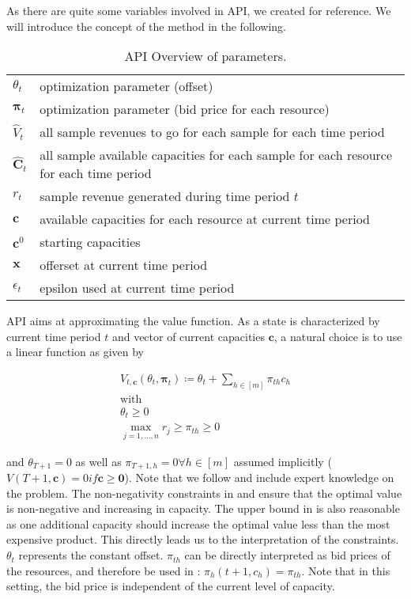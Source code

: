 As there are quite some variables involved in API, we created  for reference. We will introduce the concept of the method in the following.

\begin{table}
	\caption{API Overview of parameters.\label{tb-api-param}}
	\begin{tabular}{ll}
		$\theta_t$ & optimization parameter (offset)\\
		$\boldsymbol{\pi}_t$ & optimization parameter (bid price for each resource)\\
		$\hat{V}_t $ & all sample revenues to go for each sample for each time period\\
		$\boldsymbol{\hat{C}}_t$ & all sample available capacities for each sample for each resource for each time period\\
		$r_t$ & sample revenue generated during time period $t$\\
		$\boldsymbol{c}$ & available capacities for each resource at current time period\\
		$\boldsymbol{c}^0$ & starting capacities\\
		$\boldsymbol{x}$ & offerset at current time period\\
		$\epsilon_t$ & epsilon used at current time period
	\end{tabular}
\end{table}

API aims at approximating the value function. As a state is characterized by current time period $t$ and vector of current capacities $\boldsymbol{c}$, a natural choice is to use a linear function as given by

\begin{align}
V_{t,\boldsymbol{c}}(\theta_t, \boldsymbol{\pi}_t) \coloneqq \theta_t + \sum_{h \in [m]} \pi_{th} c_h\\
\text{with}\\
\theta_t \geq 0\label{eq-api-theta}\\
\max_{j=1, \dots, n} r_j \geq \pi_{th} \geq 0\label{eq-api-pi}
\end{align}

and $\theta_{T+1} = 0$ as well as $\pi_{T+1, h} = 0 \forall h\in[m]$ assumed implicitly ($V(T+1, \boldsymbol{c}) = 0 if \boldsymbol{c} \geq \boldsymbol{0}$). Note that we follow \cite{Koch.2017} and include expert knowledge on the problem. The non-negativity constraints in  and  ensure that the optimal value is non-negative and increasing in capacity. The upper bound in  is also reasonable as one additional capacity should increase the optimal value less than the most expensive product. This directly leads us to the interpretation of the constraints. $\theta_t$ represents the constant offset. $\pi_{th}$ can be directly interpreted as bid prices of the resources, and therefore be used in :  $\pi_h(t+1, c_h) = \pi_{th}$. Note that in this setting, the bid price is independent of the current level of capacity.

